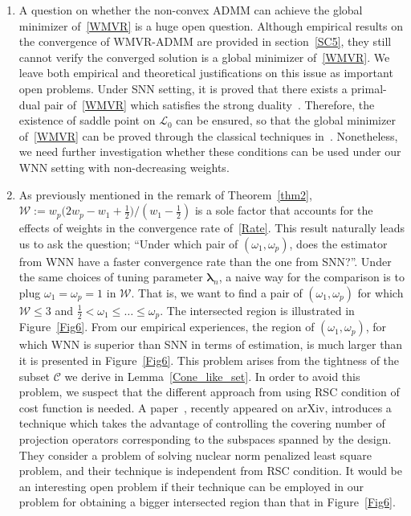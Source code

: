 \documentclass[alpha-refs]{wiley-article}
\begin{document}
\begin{enumerate}
    \item A question on whether the non-convex ADMM can achieve the global minimizer of~\eqref{WMVR} is a huge open question.
    Although empirical results on the convergence of WMVR-ADMM are provided in section~\ref{SC5}, they still cannot verify the converged solution is a global minimizer of~\eqref{WMVR}. 
    We leave both empirical and theoretical justifications on this issue as important open problems. 
    Under SNN setting, it is proved that there exists a primal-dual pair of~\eqref{WMVR} which satisfies the strong duality~\citep{shang2021regularization}.
    Therefore, the existence of saddle point on $\mathcal{L}_{0}$ can be ensured, so that the global minimizer of~\eqref{WMVR} can be proved through the classical techniques in~\citet{boyd2011distributed}.
    Nonetheless, we need further investigation whether these conditions can be used under our WNN setting with non-decreasing weights.

    \item As previously mentioned in the remark of Theorem~\ref{thm2}, $\mathcal{W}:= w_{p}\big(2w_{p}-w_{1}+\frac{1}{2}\big)/(w_{1}-\frac{1}{2})$ is a sole factor that accounts for the effects of weights in the convergence rate of~\eqref{Rate}.
    This result naturally leads us to ask the question; ``Under which pair of $(\omega_{1},\omega_{p})$, does the estimator from WNN have a faster convergence rate than the one from SNN?''.
    Under the same choices of tuning parameter $\boldsymbol{\lambda}_{n}$, a naive way for the comparison is to plug $\omega_{1}=\omega_{p}=1$ in $\mathcal{W}$. 
    That is, we want to find a pair of $(\omega_{1},\omega_{p})$ for which $\mathcal{W} \leq 3$ and $\frac{1}{2} < \omega_{1} \leq \dots \leq \omega_{p}$.
    The intersected region is illustrated in Figure~\ref{Fig6}.
    From our empirical experiences, the region of $(\omega_{1},\omega_{p})$, for which WNN is superior than SNN in terms of estimation, is much larger than it is presented in Figure~\ref{Fig6}.
    This problem arises from the tightness of the subset $\mathcal{C}$ we derive in Lemma~\ref{Cone_like_set}.
    In order to avoid this problem, we suspect that the different approach from using RSC condition of cost function is needed.
    A paper~\citet{law2021rank}, recently appeared on arXiv, introduces a technique which takes the advantage of controlling the covering number of projection operators corresponding to the subspaces spanned by the design.
    They consider a problem of solving nuclear norm penalized least square problem, and their technique is independent from RSC condition. 
    It would be an interesting open problem if their technique can be employed in our problem for obtaining a bigger intersected region than that in Figure~\ref{Fig6}.
\end{enumerate}
\end{document}
